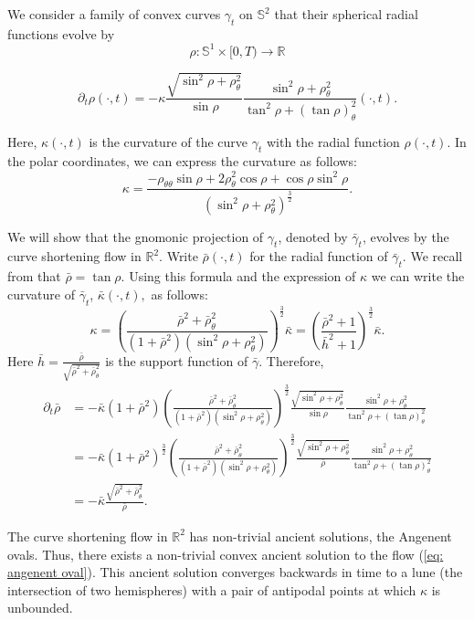 \documentclass{amsart}
\begin{document}
\begin{example}
We consider a family of convex curves $\gamma_t$ on $\mathbb{S}^2$ that their spherical radial functions evolve by
\[\rho:\mathbb{S}^1\times[0,T)\to \mathbb{R}\]

\begin{equation}\label{eq: angenent oval}
\partial_t\rho(\cdot,t)=-\kappa \frac{\sqrt{\sin^2\rho+\rho_{\theta}^2}}{\sin\rho}\frac{\sin^2\rho+\rho_{\theta}^2}{\tan^2\rho+(\tan\rho)_{\theta}^2}(\cdot,t).
\end{equation}

Here, $\kappa(\cdot,t)$ is the curvature of the curve $\gamma_t$ with the radial function $\rho(\cdot,t).$ 
In the polar coordinates, we can express the curvature as follows:
\[\kappa=\frac{-\rho_{\theta\theta}\sin\rho+2\rho_\theta^2\cos\rho+\cos\rho\sin^2\rho}{(\sin^2\rho+\rho_{\theta}^2)^{\frac{3}{2}}}.\]

We will show that the gnomonic projection of $\gamma_t$, denoted by $\bar{\gamma}_t$, evolves by the curve shortening flow in $\mathbb{R}^2.$ Write $\bar{\rho}(\cdot,t)$ for the radial function of $\bar{\gamma}_t$. We recall from \cite[page 8]{besau2014spherical} that
$\bar{\rho}=\tan\rho.$ Using this formula and the expression of $\kappa$ we can write the curvature of $\bar{\gamma}_t$,  $\bar{\kappa}(\cdot,t),$ as follows:
\[\kappa=\left(\frac{\bar{\rho}^2+\bar{\rho}_{\theta}^2}{(1+\bar{\rho}^2)(\sin^2\rho+\rho_{\theta}^2)}\right)^{\frac{3}{2}}\bar{\kappa}=\left(\frac{\bar{\rho}^2+1}{\bar{h}^2+1}\right)^{\frac{3}{2}}\bar{\kappa}.\]
Here $\bar{h}=\frac{\bar{\rho}}{\sqrt{\bar{\rho}^2+\bar{\rho}_{\theta}^2}}$ is the support function of $\bar{\gamma}.$
Therefore, 
\begin{align*}
\partial_t\bar{\rho}&=-\bar{\kappa}(1+\bar{\rho}^2)\left(\frac{\bar{\rho}^2+\bar{\rho}_{\theta}^2}{(1+\bar{\rho}^2)(\sin^2\rho+\rho_{\theta}^2)}\right)^{\frac{3}{2}}\frac{\sqrt{\sin^2\rho+\rho_{\theta}^2}}{\sin\rho}\frac{\sin^2\rho+\rho_{\theta}^2}{\tan^2\rho+(\tan\rho)_{\theta}^2}\\
&=-\bar{\kappa}(1+\bar{\rho}^2)^{\frac{3}{2}}\left(\frac{\bar{\rho}^2+\bar{\rho}_{\theta}^2}{(1+\bar{\rho}^2)(\sin^2\rho+\rho_{\theta}^2)}\right)^{\frac{3}{2}}\frac{\sqrt{\sin^2\rho+\rho_{\theta}^2}}{\bar{\rho}}\frac{\sin^2\rho+\rho_{\theta}^2}{\tan^2\rho+(\tan\rho)_{\theta}^2}\\
&=-\bar{\kappa}\frac{\sqrt{\bar{\rho}^2+\bar{\rho}_{\theta}^2}}{\bar{\rho}}.
\end{align*}

The curve shortening flow in $\mathbb{R}^2$ has non-trivial ancient solutions, the Angenent ovals. Thus, there exists a non-trivial convex ancient solution to the flow (\ref{eq: angenent oval}). This ancient solution converges backwards in time to a lune (the intersection of two hemispheres) with a pair of antipodal points at which \(\kappa\) is unbounded.
\end{example}
\end{document}

